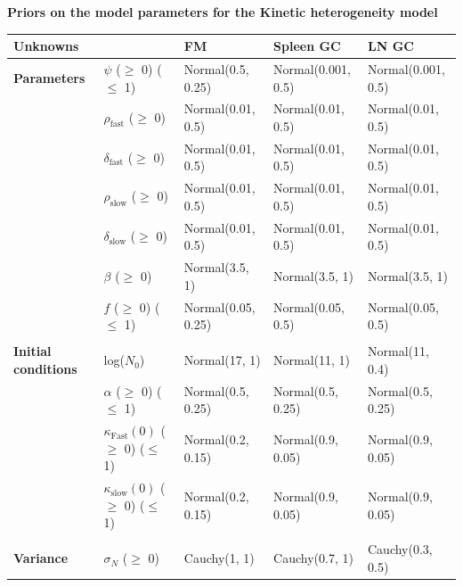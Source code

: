 \documentclass[11pt]{article}
\begin{document}
\begin{table}[h!]
	\begin{center}
		\textbf{Priors on the model parameters for the Kinetic heterogeneity model}\\
		\renewcommand{\arraystretch}{1.2}
		\begin{tabular}{l l l l l } 
			\toprule 
			\textbf{Unknowns}              &                                     & \textbf{FM}           & \textbf{Spleen GC}        &  \textbf{LN GC}        \\ 
			\toprule
			\textbf{Parameters}            &$\psi$ ($\ge$ 0) ($\le$ 1)           & Normal(0.5, 0.25)     & Normal(0.001, 0.5)   &  Normal(0.001, 0.5)   \\ 			                               
			&$\rho_{\text{fast}}$ ($\ge$ 0)                     & Normal(0.01, 0.5)     & Normal(0.01, 0.5)    &  Normal(0.01, 0.5)    \\
			&$\delta_{\text{fast}}$ ($\ge$ 0)                   & Normal(0.01, 0.5)     & Normal(0.01, 0.5)    &  Normal(0.01, 0.5)    \\
			&$\rho_{\text{slow}}$ ($\ge$ 0)                     & Normal(0.01, 0.5)     & Normal(0.01, 0.5)    &  Normal(0.01, 0.5)    \\
			&$\delta_{\text{slow}}$ ($\ge$ 0)                   & Normal(0.01, 0.5)     & Normal(0.01, 0.5)    &  Normal(0.01, 0.5)    \\
			&$\beta$ ($\ge$ 0)                     & Normal(3.5, 1)        & Normal(3.5, 1)       &  Normal(3.5, 1)       \\
			&$f$ ($\ge$ 0) ($\le$ 1)              & Normal(0.05, 0.25)     & Normal(0.05, 0.5)   &  Normal(0.05, 0.5)   \\ 	
			&&&&\\
			\textbf{Initial conditions}    &log($N_0$)                           & Normal(17, 1)         & Normal(11, 1)        &  Normal(11, 0.4)      \\			                               
			&$\alpha$ ($\ge$ 0) ($\le$ 1)           & Normal(0.5, 0.25)     & Normal(0.5, 0.25)   &  Normal(0.5, 0.25)   \\
			&$\kappa_\text{Fast}(0)$ ($\ge$ 0) ($\le$ 1)       & Normal(0.2, 0.15)     & Normal(0.9, 0.05)    &  Normal(0.9, 0.05)    \\
			&$\kappa_\text{slow}(0)$ ($\ge$ 0) ($\le$ 1)       & Normal(0.2, 0.15)     & Normal(0.9, 0.05)    &  Normal(0.9, 0.05)    \\
			&&&&\\
			\textbf{Variance}              &$\sigma_N$ ($\ge$ 0)                 & Cauchy(1, 1)          & Cauchy(0.7, 1)       &  Cauchy(0.3, 0.5)     \\ 

\end{tabular}
\end{center}
\end{table}
\end{document}
